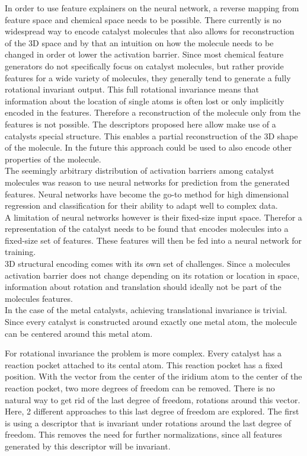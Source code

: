 In order to use feature explainers on the neural network, a reverse mapping from feature space and chemical space needs to be possible.
There currently is no widespread way to encode catalyst molecules that also allows for 
reconstruction of the 3D space and by that an intuition on how the molecule needs to be changed in order ot lower the activation barrier.
Since most chemical feature generators do not specifically focus on catalyst molecules,
but rather provide features for a wide variety of molecules, they generally tend to generate a fully rotational invariant output.
This full rotational invariance means that information about the location of single atoms is often lost or only implicitly encoded in the features.
Therefore a reconstruction of the molecule only from the features is not possible.
The descriptors proposed here allow make use of a catalysts special structure.
This enables a partial reconstruction of the 3D shape of the molecule.
In the future this approach could be used to also encode other properties of the molecule.
\\

The seemingly arbitrary distribution of activation barriers among catalyst molecules  was reason to use neural networks for prediction from the generated features.
Neural networks have become the go-to method for high dimensional regression and classification for their ability to adapt well to complex data.
\\
A limitation of neural networks however is their fixed-size input space.
Therefor a representation of the catalyst needs to be found that encodes molecules into a fixed-size set of features.
These features will then be fed into a neural network for training. 
\\
3D structural encoding comes with its own set of challenges. 
Since a molecules activation barrier does not change depending on its rotation or location in space, 
information about rotation and translation should ideally not be part of the molecules features.
\\
In the case of the metal catalysts, achieving translational invariance is trivial.
Since every catalyst is constructed around exactly one metal atom, the molecule can be centered around this metal atom.

For rotational invariance the problem is more complex.
Every catalyst has a reaction pocket attached to its cental atom.
This reaction pocket has a fixed position.
With the vector from the center of the iridium atom to the center of the reaction pocket, two more degrees of freedom can be removed.
There is no natural way to get rid of the last degree of freedom, rotations around this vector.
Here, 2 different approaches to this last degree of freedom are explored.
The first is using a descriptor that is invariant under rotations around the last degree of freedom.
This removes the need for further normalizations, since all features generated by this descriptor will be invariant.

